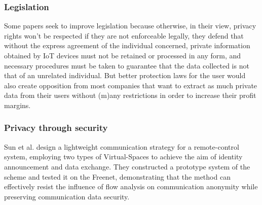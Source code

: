 \documentclass[conference]{IEEEtran}
\begin{document}

\subsubsection{Legislation}

Some papers seek to improve legislation \cite{WEBER2015618, FabianoInternet}
because otherwise, in their view, privacy rights won't be respected if they
are not enforceable legally, they defend that without the express agreement
of the individual concerned, private information obtained by IoT devices must
not be retained or processed in any form, and necessary procedures must be
taken to guarantee that the data collected is not that of an unrelated individual.
But better protection laws for the user would also create opposition from
most companies that want to extract as much private data from their users
without (m)any restrictions in order to increase their profit margins.

\subsubsection{Privacy through security}

Sun et al. \cite{SunSecure} design a lightweight communication strategy for
a remote-control system, employing two types of Virtual-Spaces to achieve the
aim of identity announcement and data exchange. They constructed a prototype
system of the scheme and tested it on the Freenet, demonstrating that the method
can effectively resist the influence of flow analysis on communication anonymity
while preserving communication data security.
\end{document}
